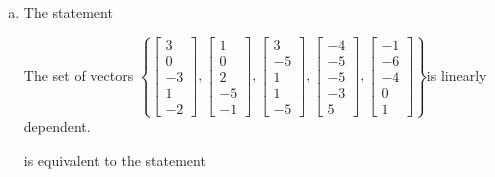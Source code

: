 \begin{exerciseAnswer}
\begin{enumerate}[(a)]
\item The statement 
\begin{center}\begin{minipage}{0.8\textwidth}
 The set of vectors \( \left\{ \left[\begin{array}{c}
3 \\
0 \\
-3 \\
1 \\
-2
\end{array}\right] , \left[\begin{array}{c}
1 \\
0 \\
2 \\
-5 \\
-1
\end{array}\right] , \left[\begin{array}{c}
3 \\
-5 \\
1 \\
1 \\
-5
\end{array}\right] , \left[\begin{array}{c}
-4 \\
-5 \\
-5 \\
-3 \\
5
\end{array}\right] , \left[\begin{array}{c}
-1 \\
-6 \\
-4 \\
0 \\
1
\end{array}\right] \right\} \)is linearly dependent.
\end{minipage}\end{center}
     is equivalent to the statement 
\begin{center}\begin{minipage}{0.8\textwidth}
 The vector equation \( x_{1} \left[\begin{array}{c}
3 \\
0 \\
-3 \\
1 \\
-2
\end{array}\right] + x_{2} \left[\begin{array}{c}
1 \\
0 \\

\end{array}
\end{minipage}
\end{center}
\end{enumerate}
\end{exerciseAnswer}
